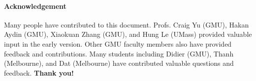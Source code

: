 \documentclass[11pt]{article}
\newcommand{\mycomment}[3][\color{blue}]{{#1{{#2}: {#3}}}}
\newcommand{\didi}[1]{\mycomment{Didier}{#1}}{}
\begin{document}
\paragraph{Acknowledgement} Many people have contributed to this document.
Profs. Craig Yu (GMU), Hakan Aydin (GMU), 
Xiaokuan Zhang (GMU), and Hung Le (UMass) provided valuable input in the early version. Other GMU faculty members also have provided feedback and contributions.  Many students including Didier (GMU), Thanh (Melbourne), and Dat (Melbourne) have contributed valuable questions and feedback. 
\textbf{Thank you!}







\end{document}
